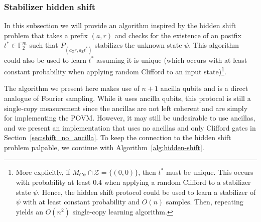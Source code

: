 \documentclass[11pt]{article}
\newcommand{\Z}{\mathsf{Z}}
\newcommand{\X}{\mathsf{X}}
\newcommand{\F}{\mathbb{F}}
\begin{document}
\subsubsection{Stabilizer hidden shift}
In this subsection we will provide an algorithm inspired by the hidden shift problem that takes a prefix $(a,r)$ and checks for the existence of an postfix $t^* \in \F_2^{m}$ such that $P_{(a_\X r, a_\Z t^*)}$ stabilizes the unknown state $\psi$. This algorithm could also be used to learn $t^*$ assuming it is unique (which occurs with at least constant probability when applying random Clifford to an input state)\footnote{More explicitly, if $M_{C\psi} \cap \mathcal{Z} = \{(0,0)\}$, then $t^*$ must be unique. This occurs with probability at least $0.4$ when applying a random Clifford to a stabilizer state $\psi$. Hence, the hidden shift protocol could be used to learn a stabilizer of $\psi$ with at least constant probability and $O(n)$ samples. Then, repeating yields an $O(n^2)$ single-copy learning algorithm.}.

The algorithm we present here makes use of $n+1$ ancilla qubits and is a direct analogue of Fourier sampling. While it uses ancilla qubits, this protocol is still a single-copy measurement since the ancillas are not left coherent and are simply for implementing the POVM. However, it may still be undesirable to use ancillas, and we present an implementation that uses no ancillas and only Clifford gates in Section~\ref{sec:shift_no_ancilla}. To keep the connection to the hidden shift problem palpable, we continue with Algorithm~\ref{alg:hidden-shift}.
\end{document}
